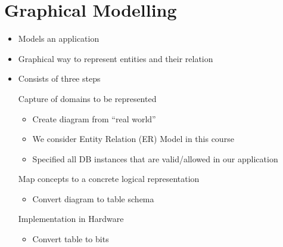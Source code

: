 
\section{Graphical Modelling}
\begin{itemize}
    \item Models an application
    \item Graphical way to represent entities and their relation
    \item Consists of three steps
        \begin{itemize}
             Capture of domains to be represented
                \begin{itemize}
                    \item Create diagram from ``real world''
                    \item We consider Entity Relation (ER) Model in this course
                    \item Specified all DB instances that are valid/allowed in our application
                \end{itemize}
             Map concepts to a concrete logical representation
                \begin{itemize}
                    \item Convert diagram to table schema
                \end{itemize}
             Implementation in Hardware
                \begin{itemize}
                    \item Convert table to bits
                \end{itemize}
        \end{itemize}
\end{itemize}

